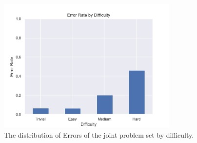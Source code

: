 \begin{figure}
  \centering
  \includegraphics[width=0.8\textwidth]{figures/Data/dist_joints/Error_Rate_by_Difficulty.png}
  \caption[Error Distribution of the joints by difficulty]{The distribution of Errors of the joint problem set by difficulty.}
  \label{fig:jt_diff_dist}
\end{figure}

